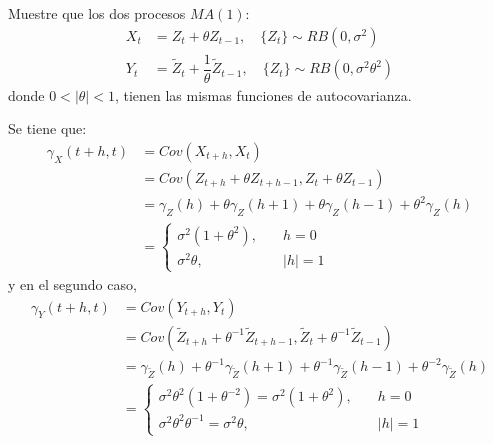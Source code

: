 

\addpoints
\question[10] Muestre que los dos procesos $MA(1)$:
\begin{align*}
X_t&=Z_t+\theta Z_{t-1},\quad \{Z_t\}\sim RB(0,\sigma^2)\\
Y_t&=\tilde{Z}_t+\dfrac{1}{\theta} \tilde{Z}_{t-1},\quad \{Z_t\}\sim RB(0,\sigma^2\theta^2)
\end{align*}
donde $0<|\theta|<1$, tienen las mismas funciones de autocovarianza.
\begin{solution}
Se tiene que:
\begin{align*}
\gamma_{X}(t+h,t)&=Cov(X_{t+h},X_t)\\
&=Cov(Z_{t+h}+\theta Z_{t+h-1},Z_t+\theta Z_{t-1})\\
&=\gamma_Z(h)+\theta\gamma_Z(h+1)+\theta\gamma_Z(h-1)+\theta^2\gamma_Z(h)\\
&=\begin{cases} \sigma^2(1+\theta^2),\quad &h=0 \\ \sigma^2 \theta,  &|h|=1\end{cases}
\end{align*}
y en el segundo caso,
\begin{align*}
\gamma_{Y}(t+h,t)&=Cov(Y_{t+h},Y_t)\\
&=Cov(\tilde{Z}_{t+h}+\theta^{-1} \tilde{Z}_{t+h-1},\tilde{Z}_t+\theta^{-1} \tilde{Z}_{t-1})\\
&=\gamma_{\tilde{Z}}(h)+\theta^{-1}\gamma_{\tilde{Z}}(h+1)+\theta^{-1}\gamma_{\tilde{Z}}(h-1)+\theta^{-2}\gamma_{\tilde{Z}}(h)\\
&=\begin{cases} \sigma^2\theta^2(1+\theta^{-2})=\sigma^2(1+\theta^{2}),\quad &h=0 \\ \sigma^2\theta^2\theta^{-1}=\sigma^2 \theta,  &|h|=1\end{cases}
\end{align*}
\end{solution}